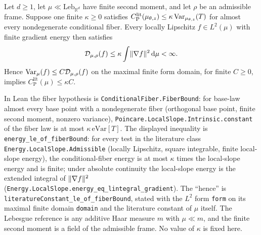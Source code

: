 \begin{lemma}
  \label{lem:conditional-fiber-energy-comparison}
  \leanok
  Let $d\ge1$, let $\mu\ll\mathrm{Leb}_{\mathbb R^d}$ have finite second moment, and let
  $\rho$ be an admissible frame. Suppose one finite $\kappa\ge0$ satisfies
  $C_{\mathrm P}^{\mathrm{lit}}(\mu_{\theta,z})\le
  \kappa\operatorname{Var}_{\mu_{\theta,z}}(T)$ for almost every nondegenerate conditional fiber.
  Every locally Lipschitz $f\in L^2(\mu)$ with finite gradient energy then satisfies
  \[
    \mathcal D_{\mu,\rho}(f)\le\kappa\int\lVert\nabla f\rVert^2\,\mathrm d\mu<\infty.
  \]
  Hence $\operatorname{Var}_\mu(f)\le C\mathcal D_{\mu,\rho}(f)$ on the maximal finite form domain,
  for finite $C\ge0$, implies $C_{\mathrm P}^{\mathrm{lit}}(\mu)\le\kappa C$.

  In Lean the fiber hypothesis is \texttt{ConditionalFiber.FiberBound}: for base-law almost every
  base point with a nondegenerate fiber (orthogonal base point, finite second moment, nonzero
  variance), \texttt{Poincare.LocalSlope.Intrinsic.constant} of the fiber law is at most
  $\kappa\,\mathrm{eVar}[T]$.  The displayed inequality is
  \texttt{energy\_le\_of\_fiberBound}: for every test in the literature class
  \texttt{Energy.LocalSlope.Admissible} (locally Lipschitz, square integrable, finite local-slope
  energy), the conditional-fiber energy is at most $\kappa$ times the local-slope energy and is
  finite; under absolute continuity the local-slope energy is the extended integral of
  $\lVert\nabla f\rVert^2$ (\texttt{Energy.LocalSlope.energy\_eq\_lintegral\_gradient}).  The
  ``hence'' is \texttt{literatureConstant\_le\_of\_fiberBound}, stated with the $L^2$ form
  \texttt{form} on its maximal finite domain \texttt{domain} and the literature constant of $\mu$
  itself.  The Lebesgue reference is any additive Haar measure $m$ with $\mu\ll m$, and the finite
  second moment is a field of the admissible frame.  No value of $\kappa$ is fixed here.
\end{lemma}

